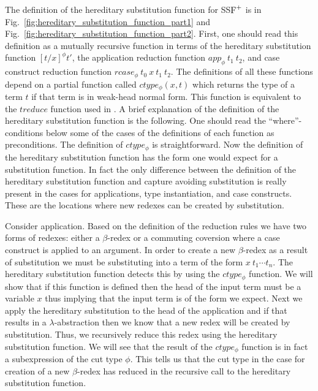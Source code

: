 The definition of the hereditary substitution function for SS$\mbox{F}^{+}$ is
in Fig.~\ref{fig:hereditary_substitution_function_part1} and
Fig.~\ref{fig:hereditary_substitution_function_part2}.  First, one
should read this definition as a mutually recursive function in terms
of the hereditary substitution function $[t/x]^\phi t'$,
the application reduction function $app_\phi\ t_1\ t_2$, and 
case construct reduction function $rcase_\phi\ t_0\ x\ t_1\ t_2$.  The
definitions of all these functions depend on a partial function called
$ctype_\phi(x, t)$ which returns the type of a term $t$ if that term
is in weak-head normal form.  This function is equivalent to the
$treduce$ function used in \cite{Watkins:2004}.
%
A brief explanation of the definition of the hereditary substitution
function is the following.  One should read the
``where''-conditions below some of the cases of the definitions of
each function as preconditions.  The definition of $ctype_\phi$ is
straightforward.  Now the definition of the hereditary substitution
function has the form one would expect for a substitution function.
In fact the only difference between the definition of the hereditary
substitution function and capture avoiding substitution is really
present in the cases for applications, type instantiation, and case
constructs.  These are the locations where new redexes can be created
by substitution.  

Consider application.  Based on the definition of the reduction rules
we have two forms of redexes: either a $\beta$-redex or a commuting
coversion where a case construct is applied to an argument.  In order
to create a new $\beta$-redex as a result of substitution we must be
substituting into a term of the form $x\ t_1 \cdots t_n$.  The
hereditary substitution function detects this by using the
$ctype_\phi$ function.  We will show that if this function is defined
then the head of the input term must be a variable $x$ thus implying
that the input term is of the form we expect.  Next we apply the
hereditary substitution to the head of the application and if that
results in a $\lambda$-abstraction then we know that a new redex will
be created by substitution.  Thus, we recursively reduce this redex
using the hereditary substitution function.  We will see that the
result of the $ctype_\phi$ function is in fact a subexpression of the
cut type $\phi$.  This tells us that the cut type in the case for
creation of a new $\beta$-redex has reduced in the recursive call to
the hereditary substitution function.


